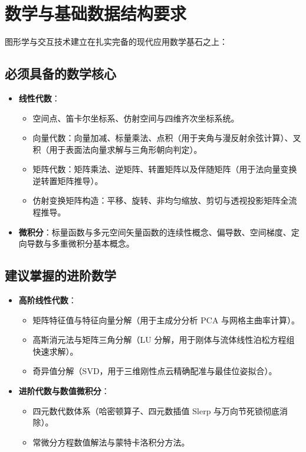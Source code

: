 \section{数学与基础数据结构要求}

图形学与交互技术建立在扎实完备的现代应用数学基石之上：

\subsection{必须具备的数学核心}
\begin{itemize}
    \item \textbf{线性代数}：
    \begin{itemize}
        \item 空间点、笛卡尔坐标系、仿射空间与四维齐次坐标系统。
        \item 向量代数：向量加减、标量乘法、点积（用于夹角与漫反射余弦计算）、叉积（用于表面法向量求解与三角形朝向判定）。
        \item 矩阵代数：矩阵乘法、逆矩阵、转置矩阵以及伴随矩阵（用于法向量变换逆转置矩阵推导）。
        \item 仿射变换矩阵构造：平移、旋转、非均匀缩放、剪切与透视投影矩阵全流程推导。
    \end{itemize}
    \item \textbf{微积分}：标量函数与多元空间矢量函数的连续性概念、偏导数、空间梯度、定向导数与多重微积分基本概念。
\end{itemize}

\subsection{建议掌握的进阶数学}
\begin{itemize}
    \item \textbf{高阶线性代数}：
    \begin{itemize}
        \item 矩阵特征值与特征向量分解（用于主成分分析 PCA 与网格主曲率计算）。
        \item 高斯消元法与矩阵三角分解（LU 分解，用于刚体与流体线性泊松方程组快速求解）。
        \item 奇异值分解（SVD，用于三维刚性点云精确配准与最佳位姿拟合）。
    \end{itemize}
    \item \textbf{进阶代数与数值微积分}：
    \begin{itemize}
        \item 四元数代数体系（哈密顿算子、四元数插值 Slerp 与万向节死锁彻底消除）。
        \item 常微分方程数值解法与蒙特卡洛积分方法。
    \end{itemize}
\end{itemize}

